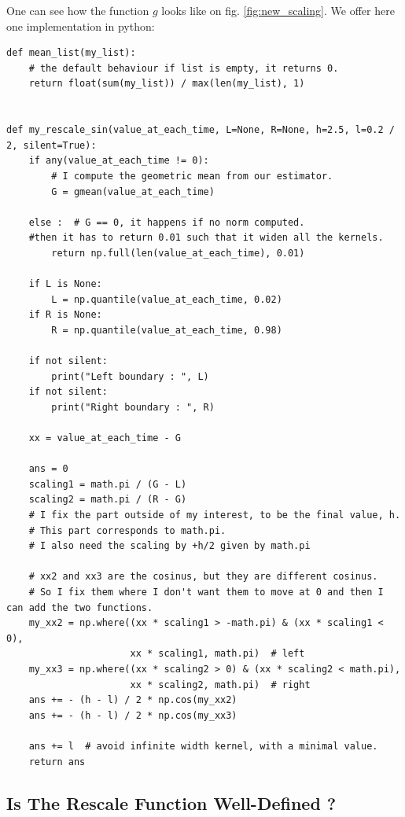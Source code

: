 \documentclass[11pt]{book}
\begin{document}
One can see how the function $g$ looks like on fig. \ref{fig:new_scaling}. We offer here one implementation in python:


\begin{Verbatim}[fontsize=\footnotesize]
def mean_list(my_list):
    # the default behaviour if list is empty, it returns 0.
    return float(sum(my_list)) / max(len(my_list), 1)
    
    
def my_rescale_sin(value_at_each_time, L=None, R=None, h=2.5, l=0.2 / 2, silent=True):
    if any(value_at_each_time != 0):
        # I compute the geometric mean from our estimator.
        G = gmean(value_at_each_time)

    else :  # G == 0, it happens if no norm computed.
    #then it has to return 0.01 such that it widen all the kernels.
        return np.full(len(value_at_each_time), 0.01)

    if L is None:
        L = np.quantile(value_at_each_time, 0.02)
    if R is None:
        R = np.quantile(value_at_each_time, 0.98)

    if not silent:
        print("Left boundary : ", L)
    if not silent:
        print("Right boundary : ", R)

    xx = value_at_each_time - G

    ans = 0
    scaling1 = math.pi / (G - L)
    scaling2 = math.pi / (R - G)
    # I fix the part outside of my interest, to be the final value, h.
    # This part corresponds to math.pi.
    # I also need the scaling by +h/2 given by math.pi

    # xx2 and xx3 are the cosinus, but they are different cosinus.
    # So I fix them where I don't want them to move at 0 and then I can add the two functions.
    my_xx2 = np.where((xx * scaling1 > -math.pi) & (xx * scaling1 < 0),
                      xx * scaling1, math.pi)  # left
    my_xx3 = np.where((xx * scaling2 > 0) & (xx * scaling2 < math.pi),
                      xx * scaling2, math.pi)  # right
    ans += - (h - l) / 2 * np.cos(my_xx2)
    ans += - (h - l) / 2 * np.cos(my_xx3)

    ans += l  # avoid infinite width kernel, with a minimal value.
    return ans
\end{Verbatim}



\subsection{Is The Rescale Function Well-Defined ?}
\label{subsection:self-defin}
\end{document}
